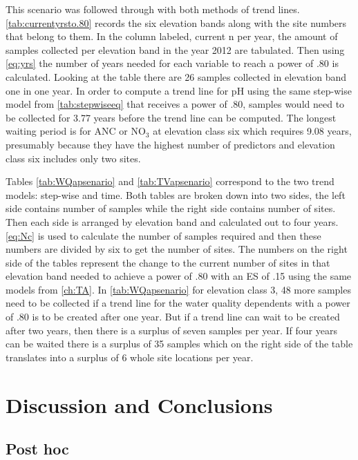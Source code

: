 This scenario was followed through with both methods of trend lines.
\autoref{tab:currentyrsto.80} records the six elevation bands along with the site numbers that belong to them. 
 In the column labeled, current n per year, the amount of samples collected per elevation band in the year 2012 are tabulated.  
 Then using \autoref{eq:yrs} the number of years needed for each variable to reach a power of .80 is calculated.
Looking at the table there are 26  samples collected in elevation band one in one year.  
In order to compute a trend line for pH using the same step-wise model from \autoref{tab:stepwiseeq} that receives a power of .80,  samples would need to be collected for 3.77 years before the trend line can be computed.   
The longest waiting period is for ANC or NO$_3$ at elevation class six which requires 9.08 years, presumably because they have the highest number of predictors and elevation class six includes only two sites. 




Tables \autoref{tab:WQapsenario} and \autoref{tab:TVapsenario} correspond to the two trend models: step-wise and time.
Both tables are broken down into two sides, the left side contains number of samples while the right side contains number of sites.
Then each side is arranged by elevation band and calculated out to four years.
\autoref{eq:Nc} is used to calculate the number of samples required and then these numbers are divided by six to get the number of sites.
The numbers on the right side of the tables represent the change to the current number of sites in that elevation band needed to achieve a power of .80 with an ES of .15 using the same models from \autoref{ch:TA}.
In \autoref{tab:WQapsenario} for elevation class 3, 48 more samples need to be collected if a trend line for the water quality dependents with a power of .80 is to be created after one year.  
But if a trend line can wait to be created after two years, then there is a surplus of seven samples per year.  
If four years can be waited there is a surplus of 35 samples which on the right side of the table translates into a surplus of 6 whole site locations per year.

\section{Discussion and Conclusions}

\subsection{Post hoc}

